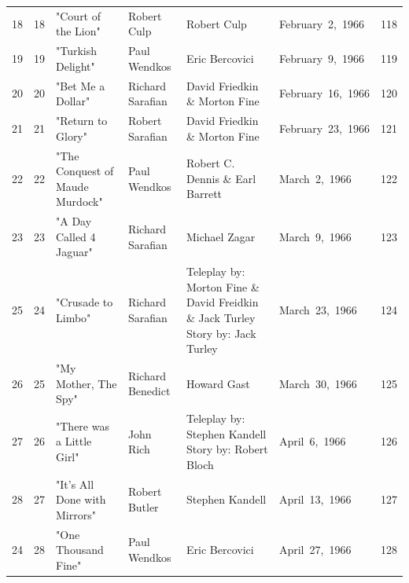 \documentclass{article}
\begin{document}
\begin{tabular}{lllllll}
18 & 18 & "Court of the Lion" & Robert Culp & Robert Culp & February 2, 1966 & 118 \\
19 & 19 & "Turkish Delight" & Paul Wendkos & Eric Bercovici & February 9, 1966 & 119 \\
20 & 20 & "Bet Me a Dollar" & Richard Sarafian & David Friedkin \& Morton Fine & February 16, 1966 & 120 \\
21 & 21 & "Return to Glory" & Robert Sarafian & David Friedkin \& Morton Fine & February 23, 1966 & 121 \\
22 & 22 & "The Conquest of Maude Murdock" & Paul Wendkos & Robert C. Dennis \& Earl Barrett & March 2, 1966 & 122 \\
23 & 23 & "A Day Called 4 Jaguar" & Richard Sarafian & Michael Zagar & March 9, 1966 & 123 \\
25 & 24 & "Crusade to Limbo" & Richard Sarafian & Teleplay by: Morton Fine \& David Freidkin \& Jack Turley Story by: Jack Turley & March 23, 1966 & 124 \\
26 & 25 & "My Mother, The Spy" & Richard Benedict & Howard Gast & March 30, 1966 & 125 \\
27 & 26 & "There was a Little Girl" & John Rich & Teleplay by: Stephen Kandell Story by: Robert Bloch & April 6, 1966 & 126 \\
28 & 27 & "It's All Done with Mirrors" & Robert Butler & Stephen Kandell & April 13, 1966 & 127 \\
24 & 28 & "One Thousand Fine" & Paul Wendkos & Eric Bercovici & April 27, 1966 & 128 \\
\bottomrule
\end{tabular}
\end{document}
